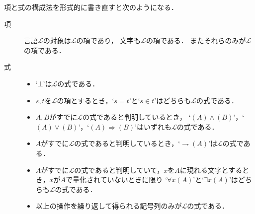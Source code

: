 	項と式の構成法を形式的に書き直すと次のようになる．
	\begin{description}
		\item[項] 言語$\mathcal{L}$の対象は$\mathcal{L}$の項であり，
			文字も$\mathcal{L}$の項である．
			またそれらのみが$\mathcal{L}$の項である．
			
		\item[式] 
			\begin{itemize}
				\item `$\bot$'は$\mathcal{L}$の式である．
				
				\item $s,t$を$\mathcal{L}$の項とするとき，`$s=t$'と`$s \in t$'はどちらも$\mathcal{L}$の式である．
					
				\item $A,B$がすでに$\mathcal{L}$の式であると判明しているとき，
					`$(A) \wedge (B)$'，`$(A) \vee (B)$'，`$(A) \Longrightarrow (B)$'はいずれも$\mathcal{L}$の式である．
				
				\item $A$がすでに$\mathcal{L}$の式であると判明しているとき，`$\rightharpoondown (A)$'は$\mathcal{L}$の式である．
				
				\item $A$がすでに$\mathcal{L}$の式であると判明していて，$x$を$A$に現れる文字とするとき，$x$が$A$で量化されていないときに限り
					`$\forall x (A)$'と`$\exists x (A)$'はどちらも$\mathcal{L}$の式である．
				
				\item 以上の操作を繰り返して得られる記号列のみが$\mathcal{L}$の式である．
			\end{itemize}
	\end{description}
	
	\begin{comment}
		`$A$では量化されていないが$B$で量化されているといった文字が無いときに限り'という
		制限は何のためにあるのでしょうか．例えばこの制限を外すと
		\begin{align}
			(\forall x ((x \in x) \vee (\forall y (\exists x ( y = x )))))
		\end{align}
		は式となりますが，同じ式で文字$x$は二回量化されています．
		これでは式を解釈するときに厄介なので，このような状況を排除するために制約を設けているのですね．
		では，
	\end{comment}
	
	
